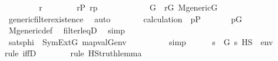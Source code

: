 \begin{isabellebody}
\ \ \isacommand{{\isacharbraceleft}{\kern0pt}}\isamarkupfalse%
\isanewline
\ \ \ \ \isamarkupfalse%
\ r\ \isanewline
\ \ \ \ \isamarkupfalse%
\ {}{\isacharcolon}{\kern0pt}\ {\isachardoublequoteopen}r{\isasymin}P{\isachardoublequoteclose}\ {\isachardoublequoteopen}r{\isasympreceq}p{\isachardoublequoteclose}\isanewline
\ \ \ \ \isamarkupfalse%
\ \isanewline
\ \ \ \ \isamarkupfalse%
\ G\ \ {\isachardoublequoteopen}r{\isasymin}G{\isachardoublequoteclose}\ {\isachardoublequoteopen}M{\isacharunderscore}{\kern0pt}generic{\isacharparenleft}{\kern0pt}G{\isacharparenright}{\kern0pt}{\isachardoublequoteclose}\isanewline
\ \ \ \ \ \ \isamarkupfalse%
\ generic{\isacharunderscore}{\kern0pt}filter{\isacharunderscore}{\kern0pt}existence\ \isamarkupfalse%
\ auto\isanewline
\isanewline
\ \ \ \ \isamarkupfalse%
\ \isamarkupfalse%
\ calculation\ {}\ {\isacartoucheopen}p{\isasymin}P{\isacartoucheclose}\ \isanewline
\ \ \ \ \isamarkupfalse%
\ {\isachardoublequoteopen}p{\isasymin}G{\isachardoublequoteclose}\ \isanewline
\ \ \ \ \ \ \isamarkupfalse%
\ M{\isacharunderscore}{\kern0pt}generic{\isacharunderscore}{\kern0pt}def\ \isamarkupfalse%
\ filter{\isacharunderscore}{\kern0pt}leqD\ \isamarkupfalse%
\ simp\isanewline
\ \ \ \ \isamarkupfalse%
\ \isamarkupfalse%
\ {}\isanewline
\ \ \ \ \isamarkupfalse%
\isanewline
\ \ \ \ \isamarkupfalse%
\ satsphi\ {\isacharcolon}{\kern0pt}\ {\isachardoublequoteopen}SymExt{\isacharparenleft}{\kern0pt}G{\isacharparenright}{\kern0pt}{\isacharcomma}{\kern0pt}\ map{\isacharparenleft}{\kern0pt}val{\isacharparenleft}{\kern0pt}G{\isacharparenright}{\kern0pt}{\isacharcomma}{\kern0pt}env{\isacharparenright}{\kern0pt}\ {\isasymTurnstile}\ {\isasymphi}{\isachardoublequoteclose}\isanewline
\ \ \ \ \ \ \isamarkupfalse%
\ simp\isanewline
\isanewline
\ \ \ \ \isamarkupfalse%
\ {\isachardoublequoteopen}{\isasymexists}s\ {\isasymin}\ G{\isachardot}{\kern0pt}\ s\ {\isasymtturnstile}HS\ {\isasymphi}\ env{\isachardoublequoteclose}\isanewline
\ \ \ \ \ \ \isamarkupfalse%
{\isacharparenleft}{\kern0pt}rule\ iffD{}{\isacharparenright}{\kern0pt}\isanewline
\ \ \ \ \ \ \ \isamarkupfalse%
{\isacharparenleft}{\kern0pt}rule\ HS{\isacharunderscore}{\kern0pt}truth{\isacharunderscore}{\kern0pt}lemma{\isacharparenright}{\kern0pt}\isanewline

\end{isabellebody}
